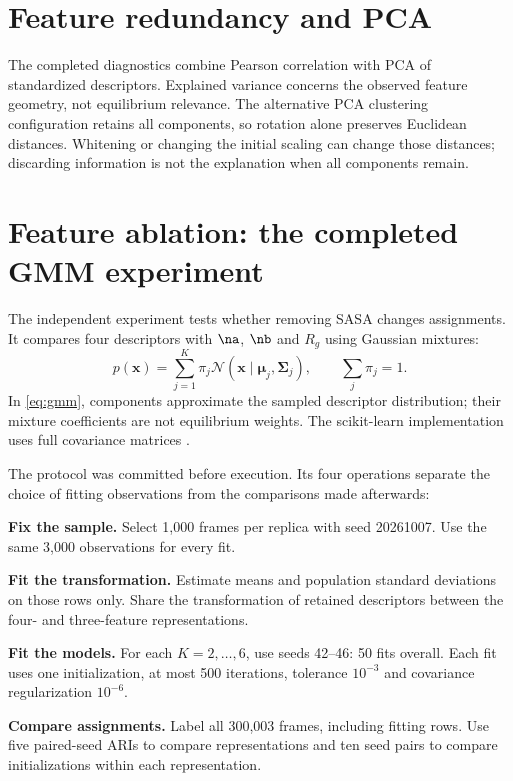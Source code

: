 \section{Feature redundancy and PCA}
The completed diagnostics combine Pearson correlation with PCA of standardized descriptors. Explained variance concerns the observed feature geometry, not equilibrium relevance. The alternative PCA clustering configuration retains all components, so rotation alone preserves Euclidean distances. Whitening or changing the initial scaling can change those distances; discarding information is not the explanation when all components remain.

\section{Feature ablation: the completed GMM experiment}
The independent experiment tests whether removing SASA changes assignments. It compares four descriptors with $\na$, $\nb$ and $R_g$ using Gaussian mixtures:
\begin{equation}
p(\mathbf{x})=\sum_{j=1}^{K}\pi_j\mathcal{N}(\mathbf{x}\mid\symbf{\mu}_j,\symbf{\Sigma}_j),\qquad \sum_j\pi_j=1.
\label{eq:gmm}
\end{equation}
In \cref{eq:gmm}, components approximate the sampled descriptor distribution; their mixture coefficients are not equilibrium weights. The scikit-learn implementation uses full covariance matrices \autocite{pedregosa2011}.

The protocol was committed before execution. Its four operations separate the choice of fitting observations from the comparisons made afterwards:
\begin{protocolsteps}
\item \textbf{Fix the sample.} Select 1,000 frames per replica with seed 20261007. Use the same 3,000 observations for every fit.
\item \textbf{Fit the transformation.} Estimate means and population standard deviations on those rows only. Share the transformation of retained descriptors between the four- and three-feature representations.
\item \textbf{Fit the models.} For each $K=2,\ldots,6$, use seeds 42--46: 50 fits overall. Each fit uses one initialization, at most 500 iterations, tolerance $10^{-3}$ and covariance regularization $10^{-6}$.
\item \textbf{Compare assignments.} Label all 300,003 frames, including fitting rows. Use five paired-seed ARIs to compare representations and ten seed pairs to compare initializations within each representation.
\end{protocolsteps}

